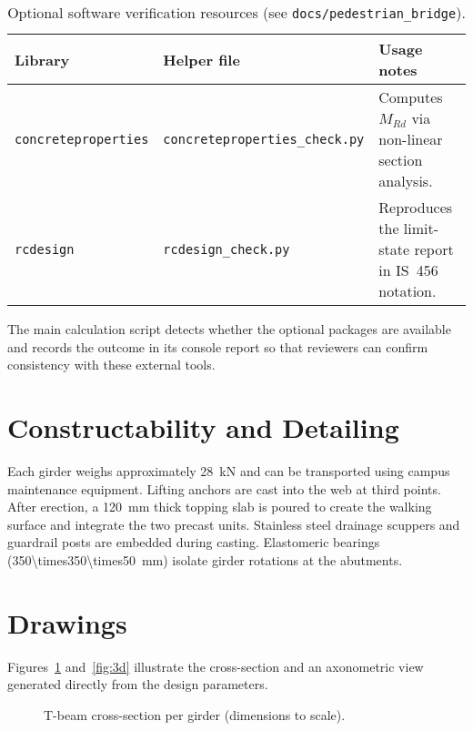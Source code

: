 \documentclass[12pt,a4paper]{article}
\begin{document}
\begin{table}[h]
\centering
\begin{tabular}{lll}
\toprule
Library & Helper file & Usage notes \\
\midrule
\texttt{concreteproperties} & \texttt{concreteproperties\_check.py} & Computes $M_{Rd}$ via non-linear section analysis. \\
\texttt{rcdesign} & \texttt{rcdesign\_check.py} & Reproduces the limit-state report in IS~456 notation. \\
\bottomrule
\end{tabular}
\caption{Optional software verification resources (see \texttt{docs/pedestrian\_bridge}).}
\label{tab:software}
\end{table}

The main calculation script detects whether the optional packages are available and records the outcome in its console report so that reviewers can confirm consistency with these external tools.

\section{Constructability and Detailing}
Each girder weighs approximately \SI{28}{\kilo\newton} and can be transported using campus maintenance equipment. Lifting anchors are cast into the web at third points. After erection, a \SI{120}{\milli\meter} thick topping slab is poured to create the walking surface and integrate the two precast units. Stainless steel drainage scuppers and guardrail posts are embedded during casting. Elastomeric bearings (\SI{350\times350\times50}{\milli\meter}) isolate girder rotations at the abutments.

\section{Drawings}
Figures~\ref{fig:section} and~\ref{fig:3d} illustrate the cross-section and an axonometric view generated directly from the design parameters.

\begin{figure}[h]
\centering
{}
\caption{T-beam cross-section per girder (dimensions to scale).}
\label{fig:section}
\end{figure}
\end{document}
